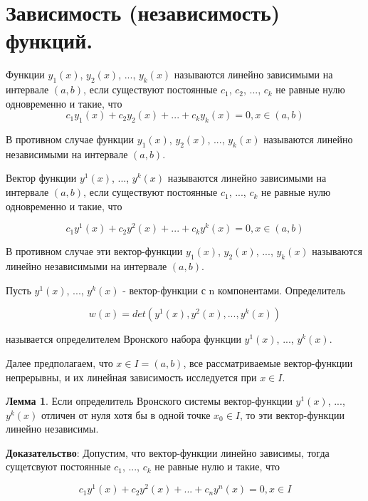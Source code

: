 \documentclass{article}
\begin{document}
    \section{Зависимость (независимость) функций.}
    
    Функции $y_1(x)$, $y_2(x)$, ..., $y_k(x)$ называются линейно зависимыми на интервале $(a, b)$, если существуют постоянные $c_1$, $c_2$, ..., $c_k$ не равные нулю одновременно и такие, что 
    \begin{equation}
        c_1y_1(x) + c_2y_2(x) + ... + c_ky_k(x) = 0, x \in (a, b)
    \end{equation}
    
    В противном случае функции $y_1(x)$, $y_2(x)$, ..., $y_k(x)$ называются линейно независимыми на интервале $(a, b)$.
    
    Вектор функции $y^1(x)$, ..., $y^k(x)$ называются линейно зависимыми на интервале $(a, b)$, если существуют постоянные $c_1$, ..., $c_k$ не равные нулю одновременно и такие, что
    
    \begin{equation}
        c_1y^1(x) + c_2y^2(x) + ... + c_ky^k(x) = 0, x \in (a, b)
    \end{equation}
    
    В противном случае эти вектор-функции $y_1(x)$, $y_2(x)$, ..., $y_k(x)$ называются линейно независимыми на интервале  $(a, b)$.
    
    Пусть $y^1(x)$, ..., $y^k(x)$ - вектор-функции с n компонентами. Определитель 
    
    \begin{equation}
        w(x) = det(y^1(x), y^2(x), ..., y^k(x))
    \end{equation}
    
    называется определителем Вронского набора функции {$y^1(x)$, ..., $y^k(x)$}.
    
    Далее предполагаем, что $x \in I = (a, b)$, все рассматриваемые вектор-функции непрерывны, и их линейная зависимость исследуется при $x\in I$.
    
    \textbf{Лемма 1}. Если определитель Вронского системы вектор-функции $y^1(x)$, ..., $y^k(x)$ отличен от нуля хотя бы в одной точке $x_0\in I$, то эти вектор-функции линейно независимы.
    
    \textbf{Доказательство}:
    Допустим,  что вектор-функции линейно зависимы, тогда сущетсвуют постоянные $c_1$, ..., $c_k$ не равные нулю и такие, что 
    
    \begin{equation}
        c_1y^1(x) + c_2y^2(x) + ... + c_ny^n(x) = 0, x \in I
    \end{equation}
    
\end{document}
